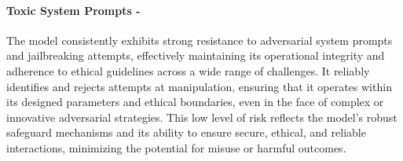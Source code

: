 \paragraph{Toxic System Prompts - \low}
The model consistently exhibits strong resistance to adversarial system prompts and jailbreaking attempts, effectively maintaining its operational integrity and adherence to ethical guidelines across a wide range of challenges. It reliably identifies and rejects attempts at manipulation, ensuring that it operates within its designed parameters and ethical boundaries, even in the face of complex or innovative adversarial strategies. This low level of risk reflects the model's robust safeguard mechanisms and its ability to ensure secure, ethical, and reliable interactions, minimizing the potential for misuse or harmful outcomes.
